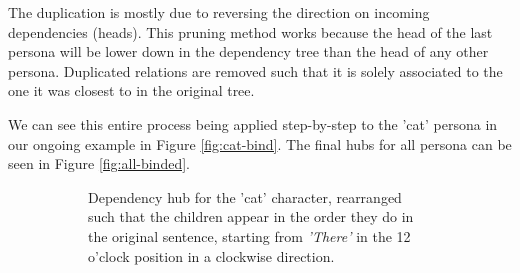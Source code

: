 The duplication is mostly due to reversing the direction on incoming dependencies (heads). This pruning method works because the head of the last persona will be lower down in the dependency tree than the head of any other persona. Duplicated relations are removed such that it is solely associated to the one it was closest to in the original tree.

We can see this entire process being applied step-by-step to the 'cat' persona in our ongoing example in Figure \ref{fig:cat-bind}. The final hubs for all persona can be seen in Figure \ref{fig:all-binded}.

\begin{figure}[h!]
\centering
\begin{subfigure}[t]{0.45\textwidth}
	\centering
    \caption{Dependency hub for the 'cat' character, rearranged such that the children appear in the order they do in the original sentence, starting from \textit{'There'} in the 12 o'clock position in a clockwise direction.}
\end{subfigure}
~
\begin{subfigure}[t]{0.45\textwidth}
	\centering
\end{subfigure}
\end{figure}
